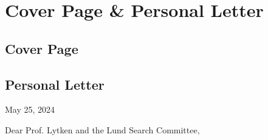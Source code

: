 \chapter{Cover Page \& Personal Letter}

\section{Cover Page} \label{sec:cover-page}
\noindent{}%

\clearpage
\section{Personal Letter} \label{sec:personal-letter}

\begin{flushright}
	May 25, 2024
\end{flushright}
\noindent Dear Prof. Lytken and the Lund Search Committee,
\vspace{0.25cm}

